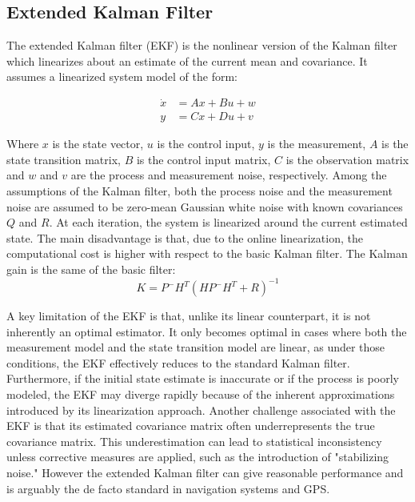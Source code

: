 \subsection{Extended Kalman Filter}
\label{subsec:extended_kalman_filter}

The extended Kalman filter (EKF) is the nonlinear version of the Kalman filter which linearizes about an estimate of the current mean and covariance. It assumes a linearized system model of the form:

\begin{equation}
    \begin{aligned}
        \dot{x} & = A x + B u + w \\
        y       & = C x + D u + v
    \end{aligned}
\end{equation}

Where $x$ is the state vector, $u$ is the control input, $y$ is the measurement, $A$ is the state transition matrix, $B$ is the control input matrix, $C$ is the observation matrix and $w$ and $v$ are the process and measurement noise, respectively.
Among the assumptions of the Kalman filter, both the process noise and the measurement noise are assumed to be zero-mean Gaussian white noise with known covariances $Q$ and $R$. At each iteration, the system is linearized around the current estimated state. The main disadvantage is that, due to the online linearization, the computational cost is higher with respect to the basic Kalman filter.
The Kalman gain is the same of the basic filter:
\begin{equation}
    K = P^- H^T (H P^- H^T + R)^{-1}
    \label{eq:kalman_gain_extended}
\end{equation}

A key limitation of the EKF is that, unlike its linear counterpart, it is not inherently an optimal estimator. It only becomes optimal in cases where both the measurement model and the state transition model are linear, as under those conditions, the EKF effectively reduces to the standard Kalman filter. Furthermore, if the initial state estimate is inaccurate or if the process is poorly modeled, the EKF may diverge rapidly because of the inherent approximations introduced by its linearization approach. Another challenge associated with the EKF is that its estimated covariance matrix often underrepresents the true covariance matrix. This underestimation can lead to statistical inconsistency unless corrective measures are applied, such as the introduction of "stabilizing noise."
However the extended Kalman filter can give reasonable performance and is arguably the de facto standard in navigation systems and GPS.

